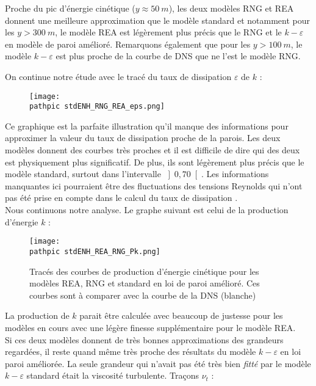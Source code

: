 \documentclass[a4paper,10pt]{article}
\newcommand\pathpic{/home/saura/Documents/Latex_files/Pic/}
\newcommand{\keps}{$k-\varepsilon$}
\begin{document}
Proche du pic d'énergie cinétique ($y \approx 50\ m$), les deux modèles RNG et REA donnent une meilleure approximation que le modèle standard et notamment pour les $y > 300 \ m$, le modèle REA est légèrement plus précis que le RNG et le \keps $ $ en modèle de paroi amélioré. Remarquons également que pour les $y > 100 \ m$, le modèle \keps $ $ est plus proche de la courbe de DNS que ne l'est le modèle RNG. \\

\pagebreak

On continue notre étude avec le tracé du taux de dissipation $\varepsilon$ de $k$ :
\begin{figure}[ht!]
\centering
\texttt{[image: \\pathpic stdENH\_RNG\_REA\_eps.png]}
\caption{}
\label{REA_RNG_eps}
\end{figure}

Ce graphique est la parfaite illustration qu'il manque des informations pour approximer la valeur du taux de dissipation proche de la parois. Les deux modèles donnent des courbes très proches et il est difficile de dire qui des deux est physiquement plus significatif. De plus, ils sont légèrement plus précis que le modèle standard, surtout dans l'intervalle $\left] 0, 70 \right[$. Les informations manquantes ici pourraient être des fluctuations des tensions Reynolds qui n'ont pas été prise en compte dans le calcul du taux de dissipation . \\
Nous continuons notre analyse. Le graphe suivant est celui de la production d'énergie $k$ :

\begin{figure} [ht!]
\centering 
\texttt{[image: \\pathpic stdENH\_REA\_RNG\_Pk.png]}
\caption{\footnotesize{Tracés des courbes de production d'énergie cinétique pour les modèles REA, RNG et standard en loi de paroi amélioré. Ces courbes sont à comparer avec la courbe de la DNS (blanche)}}
\label{REA_RNG_Pk}
\end{figure}

La production de $k$ parait être calculée avec beaucoup de justesse pour les modèles en cours avec une légère finesse supplémentaire pour le modèle REA. \\
Si ces deux modèles donnent de très bonnes approximations des grandeurs regardées, il reste quand même très proche des résultats du modèle \keps $ $ en loi paroi améliorée. La seule grandeur qui n'avait pas été très bien \textit{fitté} par le modèle \keps $ $ standard était la viscosité turbulente. Traçons $\nu_t$ :
\end{document}
